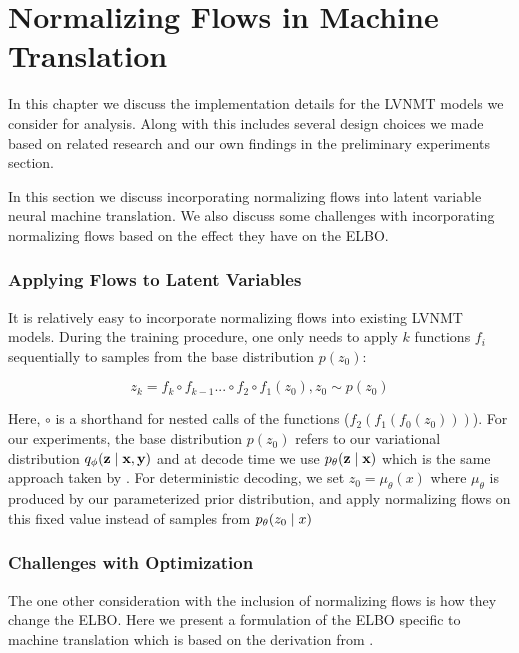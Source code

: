 \chapter{Normalizing Flows in Machine Translation}

In this chapter we discuss the implementation details for the \ac{LVNMT} models we consider for analysis. Along with this includes several design choices we made based on related research and our own findings in the preliminary experiments section. 


In this section we discuss incorporating normalizing flows into latent variable neural machine translation. We also discuss some challenges with incorporating normalizing flows based on the effect they have on the ELBO. 

\subsection{Applying Flows to Latent Variables}
It is relatively easy to incorporate normalizing flows into existing LVNMT models. During the training procedure, one only needs to apply $k$ functions $f_{i}$ sequentially to samples from the base distribution $p(z_{0})$: 

\begin{equation}
z_{k} = f_{k} \circ f_{k-1} ... \circ f_{2} \circ f_{1}(z_{0}) , z_{0} \sim p(z_{0})
\end{equation}

Here, $\circ$ is a shorthand for nested calls of the functions ($f_{2}(f_{1}(f_{0}(z_{0})))$). For our experiments, the base distribution $p(z_{0})$ refers to our variational distribution $q_{\phi}(\textbf{z} \; | \;{\textbf{x}, \textbf{y}})$ and at decode time we use $p_{\theta}(\textbf{z} \; | \;{\textbf{x}})$ which is the same approach taken by \citet{Zhang2016VNMT}. For deterministic decoding, we set $z_{0} = \mu_{\theta}(x)$ where $\mu_{\theta}$ is produced by our parameterized prior distribution, and apply normalizing flows on this fixed value instead of samples from $p_{\theta}(z_{0} \; | \;{x})$

\subsection{Challenges with Optimization}

The one other consideration with the inclusion of normalizing flows is how they change the ELBO. Here we present a formulation of the ELBO specific to machine translation which is based on the derivation from \citealp[Section 4.2]{rezende2015VIwithNF}.

